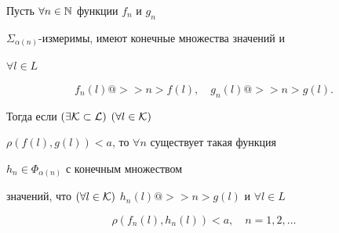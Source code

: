 \begin{lems} 


Пусть $\forall n\in\Bbb N$ функции $f_n$ и $g_n$ \ 


$\Sigma_{\alpha(n)}$-измеримы, имеют конечные множества значений и 


$\forall l\in L$ 


$$ 


f_n(l)@>>n>f(l),\quad g_n(l)@>>n>g(l). 


$$ 


Тогда если $(\exists\cal K\subset L)$ $(\forall l\in\cal K)$ 


$\rho(f(l),g(l))<a$, то $\forall n$ существует такая функция 


$h_n\in\Phi_{\alpha(n)}$ с конечным множеством 


значений, что $(\forall l\in\cal K)$ $h_n(l)@>>n>g(l)$ и $\forall l\in L$


\begin{equation} 


\rho(f_n(l),h_n(l))<a,\quad n=1,2,\dotsc 


\end{equation} 


\end{lems} 


 


